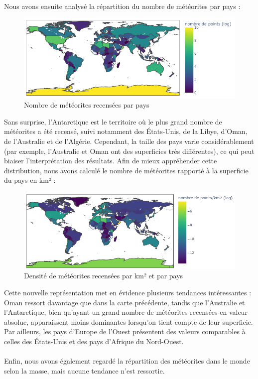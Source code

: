 \documentclass[12pt]{article}
\begin{document}
\\
Nous avons ensuite analysé la répartition du nombre de météorites par pays :
\begin{figure}[H]
 \centering 
\includegraphics[width=17cm]{Images/exploration/map_points_countries_avec_echelle.png}
 \caption{Nombre de météorites recensées par pays}
 \end{figure}
Sans surprise, l’Antarctique est le territoire où le plus grand nombre de météorites a été recensé, suivi notamment des États-Unis, de la Libye, d’Oman, de l’Australie et de l’Algérie. Cependant, la taille des pays varie considérablement (par exemple, l’Australie et Oman ont des superficies très différentes), ce qui peut biaiser l’interprétation des résultats. Afin de mieux appréhender cette distribution, nous avons calculé le nombre de météorites rapporté à la superficie du pays en km² :
\begin{figure}[H] 
\centering
 \includegraphics[width=17cm]{Images/exploration/map_points_km2_avec_echelle.png}
 \caption{Densité de météorites recensées par km² et par pays}
 \end{figure}
Cette nouvelle représentation met en évidence plusieurs tendances intéressantes : Oman ressort davantage que dans la carte précédente, tandis que l’Australie et l’Antarctique, bien qu’ayant un grand nombre de météorites recensées en valeur absolue, apparaissent moins dominantes lorsqu’on tient compte de leur superficie. Par ailleurs, les pays d’Europe de l’Ouest présentent des valeurs comparables à celles des États-Unis et des pays d’Afrique du Nord-Ouest.\\
\\
Enfin, nous avons également regardé la répartition des météorites dans le monde selon la masse, mais aucune tendance n'est ressortie.
\end{document}
